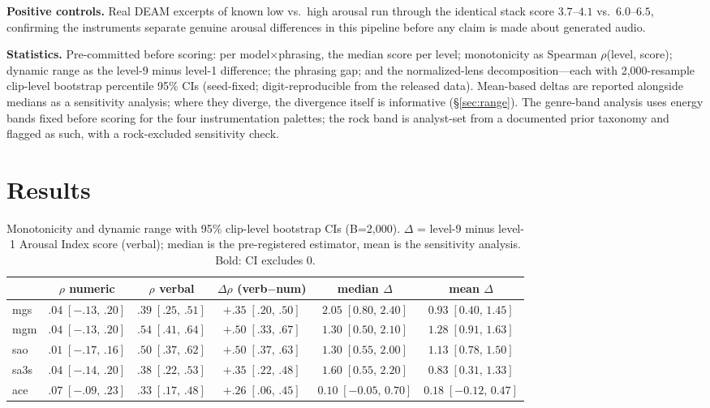 \documentclass{article}
\newcommand{\ci}[2]{[#1,\,#2]}
\newcommand{\inst}{Arousal Index}
\begin{document}
\textbf{Positive controls.} Real DEAM excerpts of known low vs.\ high arousal
run through the identical stack score $3.7$--$4.1$ vs.\ $6.0$--$6.5$,
confirming the instruments separate genuine arousal differences in this
pipeline before any claim is made about generated audio.

\textbf{Statistics.} Pre-committed before scoring: per model$\times$phrasing,
the median score per level; monotonicity as Spearman $\rho$(level, score);
dynamic range as the level-9 minus level-1 difference; the phrasing gap; and
the normalized-lens decomposition---each with 2{,}000-resample clip-level
bootstrap percentile 95\% CIs (seed-fixed; digit-reproducible from the released data). Mean-based deltas are
reported alongside medians as a sensitivity analysis; where they diverge, the
divergence itself is informative (\S\ref{sec:range}). The genre-band analysis
uses energy bands fixed before scoring for the four instrumentation palettes;
the rock band is analyst-set from a documented prior taxonomy and flagged as
such, with a rock-excluded sensitivity check.

\section{Results}

\begin{table}[!t]
  \caption{Monotonicity and dynamic range with 95\% clip-level bootstrap CIs
  (B=2{,}000). $\Delta$ = level-9 minus level-1 \inst{} score (verbal);
  median is the pre-registered estimator, mean is the sensitivity analysis.
  Bold: CI excludes 0.}
  \label{tab:main}
  \centering
  \small
  \setlength{\tabcolsep}{4pt}
  \begin{tabular}{lccccc}
    \toprule
    & $\rho$ numeric & $\rho$ verbal & $\Delta\rho$ (verb$-$num)
    & median $\Delta$ & mean $\Delta$ \\
    \midrule
    mgs  & $.04\;\ci{-.13}{.20}$ & $\mathbf{.39}\;\ci{.25}{.51}$ & $\mathbf{+.35}\;\ci{.20}{.50}$ & $\mathbf{2.05}\;\ci{0.80}{2.40}$ & $\mathbf{0.93}\;\ci{0.40}{1.45}$ \\
    mgm  & $.04\;\ci{-.13}{.20}$ & $\mathbf{.54}\;\ci{.41}{.64}$ & $\mathbf{+.50}\;\ci{.33}{.67}$ & $\mathbf{1.30}\;\ci{0.50}{2.10}$ & $\mathbf{1.28}\;\ci{0.91}{1.63}$ \\
    sao  & $.01\;\ci{-.17}{.16}$ & $\mathbf{.50}\;\ci{.37}{.62}$ & $\mathbf{+.50}\;\ci{.37}{.63}$ & $\mathbf{1.30}\;\ci{0.55}{2.00}$ & $\mathbf{1.13}\;\ci{0.78}{1.50}$ \\
    sa3s & $.04\;\ci{-.14}{.20}$ & $\mathbf{.38}\;\ci{.22}{.53}$ & $\mathbf{+.35}\;\ci{.22}{.48}$ & $\mathbf{1.60}\;\ci{0.55}{2.20}$ & $\mathbf{0.83}\;\ci{0.31}{1.33}$ \\
    ace  & $.07\;\ci{-.09}{.23}$ & $\mathbf{.33}\;\ci{.17}{.48}$ & $\mathbf{+.26}\;\ci{.06}{.45}$ & $0.10\;\ci{-0.05}{0.70}$ & $0.18\;\ci{-0.12}{0.47}$ \\
    \bottomrule
  \end{tabular}
\end{table}
\label{sec:results}
\end{document}
